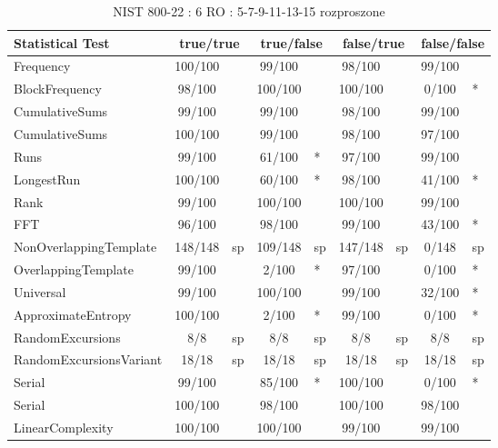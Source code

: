 \begin{table}[H]
\centering
\caption{NIST 800-22 : 6 RO : 5-7-9-11-13-15 rozproszone}
\label{tab:ch4_nist_22_6RO_60I_DISTRIBUTED}
\begin{tabular}{|l|c|l|c|l|c|l|c|l|}
\hline
\textbf{Statistical Test} & \multicolumn{2}{c|}{\textbf{true/true}} & \multicolumn{2}{c|}{\textbf{true/false}} & \multicolumn{2}{c|}{\textbf{false/true}} & \multicolumn{2}{c|}{\textbf{false/false}} \\ \hline
Frequency               & 100/100 &     &  99/100 &     &  98/100 &     &  99/100 &     \\ \hline
BlockFrequency          &  98/100 &     & 100/100 &     & 100/100 &     &   0/100 & *   \\ \hline
CumulativeSums          &  99/100 &     &  99/100 &     &  98/100 &     &  99/100 &     \\ \hline
CumulativeSums          & 100/100 &     &  99/100 &     &  98/100 &     &  97/100 &     \\ \hline
Runs                    &  99/100 &     &  61/100 & *   &  97/100 &     &  99/100 &     \\ \hline
LongestRun              & 100/100 &     &  60/100 & *   &  98/100 &     &  41/100 & *   \\ \hline
Rank                    &  99/100 &     & 100/100 &     & 100/100 &     &  99/100 &     \\ \hline
FFT                     &  96/100 &     &  98/100 &     &  99/100 &     &  43/100 & *   \\ \hline
NonOverlappingTemplate  & 148/148 & sp  & 109/148 & sp  & 147/148 & sp  &   0/148 & sp  \\ \hline
OverlappingTemplate     &  99/100 &     &   2/100 & *   &  97/100 &     &   0/100 & *   \\ \hline
Universal               &  99/100 &     & 100/100 &     &  99/100 &     &  32/100 & *   \\ \hline
ApproximateEntropy      & 100/100 &     &   2/100 & *   &  99/100 &     &   0/100 & *   \\ \hline
RandomExcursions        &     8/8 & sp  &     8/8 & sp  &     8/8 & sp  &     8/8 & sp  \\ \hline
RandomExcursionsVariant &   18/18 & sp  &   18/18 & sp  &   18/18 & sp  &   18/18 & sp  \\ \hline
Serial                  &  99/100 &     &  85/100 & *   & 100/100 &     &   0/100 & *   \\ \hline
Serial                  & 100/100 &     &  98/100 &     & 100/100 &     &  98/100 &     \\ \hline
LinearComplexity        & 100/100 &     & 100/100 &     &  99/100 &     &  99/100 &     \\ \hline
\end{tabular}
\end{table}



